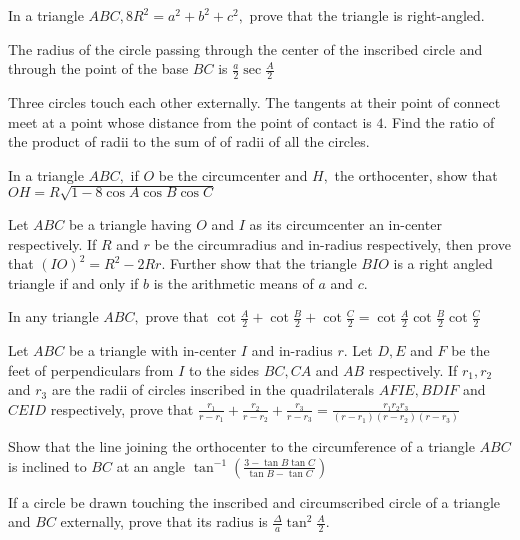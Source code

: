\item In a triangle $ABC, 8R^2 = a^2 + b^2 + c^2,$ prove that the triangle is right-angled.

\item The radius of the circle passing through the center of the inscribed circle and through the point of the base $BC$ is
   $\frac{a}{2}\sec\frac{A}{2}$

\item Three circles touch each other externally. The tangents at their point of connect meet at a point whose distance from the point
   of contact is $4.$ Find the ratio of the product of radii to the sum of of radii of all the circles.

\item In a triangle $ABC,$ if $O$ be the circumcenter and $H,$ the orthocenter, show that $OH = R\sqrt{1 -
   8\cos A\cos B\cos C}$

\item Let $ABC$ be a triangle having $O$ and $I$ as its circumcenter an in-center respectively. If $R$ and
   $r$ be the circumradius and in-radius respectively, then prove that $(IO)^2 = R^2 - 2Rr.$ Further show that the
   triangle $BIO$ is a right angled triangle if and only if $b$ is the arithmetic means of $a$ and $c.$

\item In any triangle $ABC,$ prove that $\cot\frac{A}{2} + \cot\frac{B}{2} + \cot\frac{C}{2} =
   \cot\frac{A}{2}\cot\frac{B}{2}\cot\frac{C}{2}$

\item Let $ABC$ be a triangle with in-center $I$ and in-radius $r.$ Let $D, E$ and $F$ be the feet of
   perpendiculars from $I$ to the sides $BC, CA$ and $AB$ respectively. If $r_1, r_2$ and $r_3$ are
   the radii of circles inscribed in the quadrilaterals $AFIE, BDIF$ and $CEID$ respectively, prove that
   $\frac{r_1}{r - r_1} + \frac{r_2}{r - r_2} + \frac{r_3}{r - r_3} = \frac{r_1r_2r_3}{(r - r_1)(r - r_2)(r - r_3)}$

\item Show that the line joining the orthocenter to the circumference of a triangle $ABC$ is inclined to $BC$ at an angle
   $\tan^{-1}\left(\frac{3 - \tan B\tan C}{\tan B - \tan C}\right)$

\item If a circle be drawn touching the inscribed and circumscribed circle of a triangle and $BC$ externally, prove that its
   radius is $\frac{\Delta}{a}\tan^2\frac{A}{2}.$

